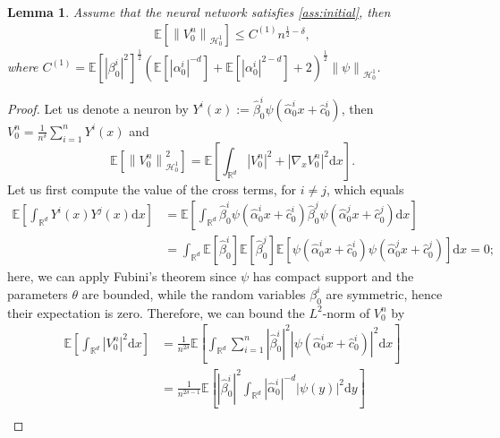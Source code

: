 \documentclass[11pt,a4paper,reqno]{amsart}
\numberwithin{equation}{section}
\theoremstyle{plain}
\newtheorem{lemma}[theorem]{Lemma}
\theoremstyle{definition}
\def\ud{\mathrm d}
\newcommand{\E}{\mathbb{E}}
\newcommand{\cH}{\mathcal{H}}
\newcommand{\norm}[1]{\left\|#1 \right\|} %
\newcommand{\abs}[1]{\left|#1\right|} %
\begin{document}
\begin{lemma}
\label{lem:v0}
Assume that the neural network satisfies \cref{ass:initial}, then
\begin{align*}
    \E \left[ \norm{V^n_0}_{\cH_0^1} \right] \le C^{\left( 1 \right)}n^{\frac{1}{2} - \delta},
\end{align*}
where $C^{\left( 1 \right)} = \E \left[ \abs{\beta_0^i}^2 \right]^{\frac{1}{2}} \left( \E \left[ \abs{\alpha_0^i}^{-d} \right] + \E \left[ \abs{\alpha_0^i}^{2-d} \right] + 2 \right)^{\frac{1}{2}} \norm{\psi}_{\cH_0^1}$.
\end{lemma}

\begin{proof}
Let us denote a neuron by $Y^i (x) := \hat\beta_0^i \psi \left( \hat\alpha_0^i x + \hat c_0^i \right)$, then $V_0^n = \frac{1}{n^{\delta}} \sum_{i = 1}^n Y^i (x)$ and
\begin{equation}
\label{eq:initial_network_expectation}
\E \left[ \norm{V^n_0}_{\cH_0^1}^2 \right] = \E \left[ \int_{\mathbb{R}^d} \left| V^n_0 \right|^2 + \left| \nabla_x V^n_0 \right|^2 \ud x \right].
\end{equation}
Let us first compute the value of the cross terms, for $i \neq j$, which equals
\begin{align*}
\E \left[ \int_{\mathbb{R}^d} Y^i(x) Y^j(x) \ud x \right] 
    &= \E \left[ \int_{\mathbb{R}^d} \hat\beta_0^i \psi \left( \hat\alpha_0^i x + \hat c_0^i \right) \hat\beta_0^j \psi \left( \hat\alpha_0^j x + \hat c_0^j \right) \ud x \right] \\ 
    &= \int_{\mathbb{R}^d} \E \left[ \hat\beta_0^i \right] \E \left[ \hat\beta_0^j \right] \E \left[ \psi \left( \hat\alpha_0^i x + \hat c_0^i \right) \psi \left( \hat\alpha_0^j x + \hat c_0^j \right) \right] \ud x
    = 0;
\end{align*}
here, we can apply Fubini's theorem since $\psi$ has compact support and the parameters $\theta$ are bounded, while the random variables $\beta^i_0$ are symmetric, hence their expectation is zero.
Therefore, we can bound the $L^2$-norm of $V_0^n$ by
\begin{align}
\label{eq:bound0}
\E \left[ \int_{\mathbb{R}^d} \left| V^n_0 \right|^2 \ud x \right] 
    &= \frac{1}{n^{2 \delta}} \E \left[ \int_{\mathbb{R}^d} \sum_{i = 1}^n \abs{\hat\beta_0^i}^2 \abs{\psi \left( \hat\alpha_0^i x + \hat c_0^i \right)}^2 \ud x \right] \nonumber\\ 
    &= \frac{1}{n^{2 \delta-1}} \E \left[ \abs{\hat\beta_0^i}^2 \int_{\mathbb{R}^d} \abs{\hat\alpha_0^i}^{-d} \abs{\psi (y)}^2 \ud y \right] \nonumber\\ 

\end{align}
\end{proof}
\end{document}
